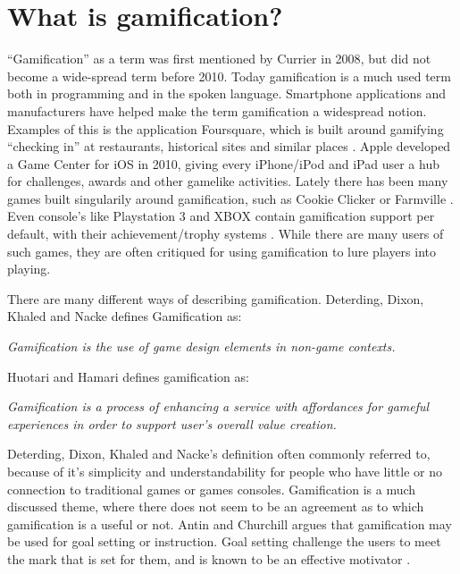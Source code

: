 \section{What is gamification?}
\label{sec:gamification}

``Gamification'' as a term was first mentioned by Currier in 2008\cite{gamificationcurrier}, but did not become a wide-spread term before 2010. Today gamification is a much used term both in programming and in the spoken language. Smartphone applications and manufacturers have helped make the term gamification a widespread notion. Examples of this is the application Foursquare, which is built around gamifying ``checking in'' at restaurants, historical sites and similar places \cite{foursquare}. Apple developed a Game Center for iOS in 2010, giving every iPhone/iPod and iPad user a hub for challenges, awards and other gamelike activities\cite{applegamecenter}. Lately there has been many games built singularily around gamification, such as Cookie Clicker \cite{cookieclicker} or Farmville \cite{farmville}. Even console's like Playstation 3 and XBOX contain gamification support per default, with their achievement/trophy systems \cite{xbox, playstation}. While there are many users of such games, they are often critiqued for using gamification to lure players into playing. 


There are many different ways of describing gamification. Deterding, Dixon, Khaled and Nacke\cite{Deterding:2011:GDE:2181037.2181040} defines Gamification as:

\textit{Gamification is the use of game design elements in non-game
contexts.}

Huotari and Hamari\cite{huotari2012defining} defines gamification as:

\textit{Gamification is a process of enhancing a service with affordances for gameful experiences in order to support user's overall value creation.}

Deterding, Dixon, Khaled and Nacke's definition often commonly referred to, because of it's simplicity and understandability for people who have little or no connection to traditional games or games consoles.
Gamification is a much discussed theme, where there does not seem to be an agreement as to which gamification is a useful or not. 
Antin and Churchill\cite{antin2011badges} argues that gamification may be used for goal setting or instruction. Goal setting challenge the users to meet the mark that is set for them, and is known to be an effective motivator \cite{ling2005using}. 

